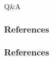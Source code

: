 \documentclass[compress]{beamer} %
\begin{document}
  \begin{frame}
   {\Huge
     \vspace {0.15\textwidth}
     \begin{columns}
       \begin{column}{0.3\textwidth}
       \end{column}
       \begin{column}{0.3\textwidth}
       \end{column}
       \begin{column}{0.3\textwidth}
       \end{column}
     \end{columns}
   }
   \vspace {0.025\textwidth}
   \begin{center}
   {\huge Q\&A}
   \end{center}
 \end{frame}

\begin{frame}\frametitle{References}
\frametitle{References}


\end{frame}
\end{document}
